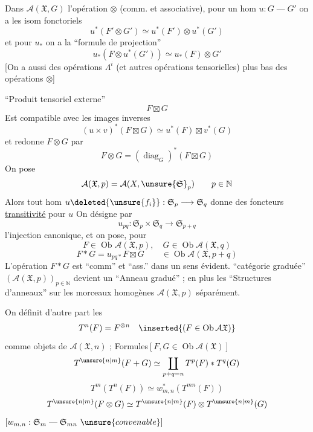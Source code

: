 Dans $\mathcal A(\mathfrak X,G)$  l'opération $\otimes$ (comm. et associative), pour un hom $u:G\mathrel{\text{---}}G'$
on a les isom fonctoriels
\[
u^*(F'\otimes G')\simeq u^*(F')\otimes u^*(G')
\]
et pour $u_*$ on a la ``formule de projection''
\[
u_*(F\otimes u^*(G'))\simeq u_*(F)\otimes G'
\]
[On a aussi des opérations $\Lambda^i$ (et autres opérations tensorielles)  plus bas des opérations $\otimes$]

``Produit tensoriel externe''
\[
F\boxtimes G
\]
Est compatible avec les images inverses
\[
(u\times v)^*(F\boxtimes G)\simeq u^*(F)\boxtimes v^*(G)
\]
et redonne $F\otimes G$ par
\[
F\otimes G=(\operatorname{diag}_G)^*(F\boxtimes G)
\]
On pose
\[
\mathcal A(\mathfrak X,p)=\mathcal A(X,\unsure{\mathfrak S}_p)\qquad p\in\mathbb N
\]
Alors tout hom $u\deleted{\unsure{f_i}}:\mathfrak S_p\longrightarrow\mathfrak S_q$ donne des foncteurs
 \uline{transitivité} pour $u$
On désigne par
\[
u_{pq}:\mathfrak S_p\times\mathfrak S_q\longrightarrow\mathfrak S_{p+q}
\]
l'injection canonique, et on pose, pour
\[
F\in\operatorname{Ob}\mathcal A(\mathfrak X,p),\quad G\in\operatorname{Ob}\mathcal A(\mathfrak X,q)
\]
\[
F*G=u_{pq*}F\boxtimes G\qquad\in\operatorname{Ob}\mathcal A(\mathfrak X,p+q)
\]
L'opération $F*G$ est ``comm'' et ``ass.'' dans un sens évident.   ``catégorie graduée'' $(\mathcal A(\mathfrak X,p))_{p\in\mathbb N}$ devient un ``Anneau gradué'' ; en plus les ``Structures d'anneaux'' sur les morceaux homogènes $\mathcal A(\mathfrak X,p)$ séparément.

On définit d'autre part les
\[
T^n(F)=F^{\otimes n}\quad\inserted{(F\in\operatorname{Ob}\mathcal A\mathfrak X)}
\]
comme objets de $\mathcal A(\mathfrak X,n)$ ;
Formules\qquad $[F,G\in\operatorname{Ob}\mathcal A(\mathfrak X)]$
\[
T^{\unsure{n|m}}(F+G)\simeq\coprod_{p+q=n}T^p(F)*T^q(G)
\]
\[
T^m(T^n(F))\simeq w_{m,n}^*(T^{mn}(F))
\]
\[
T^{\unsure{n|m}}(F\otimes G)\simeq T^{\unsure{n|m}}(F)\otimes T^{\unsure{n|m}}(G)
\]
$[w_{m,n}:\mathfrak S_m\mathrel{\text{---}}\mathfrak S_{mn}\ \unsure{convenable}]$

